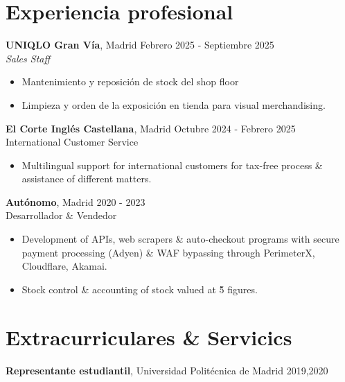 \documentclass[11pt,a4paper]{article}
\begin{document}
\section*{Experiencia profesional}
\noindent
\textbf{UNIQLO Gran Vía}, Madrid \hfill Febrero 2025 - Septiembre 2025 \\
\textit{Sales Staff}
    \begin{itemize}[label=-,itemsep=0pt]
        \item Mantenimiento y reposición de stock del shop floor
        \item Limpieza y orden de la exposición en tienda para visual merchandising.
    \end{itemize}

\noindent
\textbf{El Corte Inglés Castellana}, Madrid \hfill Octubre 2024 - Febrero 2025 \\
International Customer Service
    \begin{itemize}[label=-]
        \item Multilingual support for international customers for tax-free process \& assistance of different matters.
    \end{itemize}

\noindent
\textbf{Autónomo}, Madrid \hfill 2020 - 2023\\
Desarrollador \& Vendedor
    \begin{itemize}[label=-]
        \item Development of APIs, web scrapers \& auto-checkout programs with secure payment processing (Adyen) \& WAF bypassing through PerimeterX, Cloudflare, Akamai.
        \item Stock control \& accounting of stock valued at \~ 5 figures.
    \end{itemize}

\section*{Extracurriculares \& Servicics}
\textbf{Representante estudiantil}, Universidad Politécnica de Madrid \hfill 2019,2020


\end{document}
